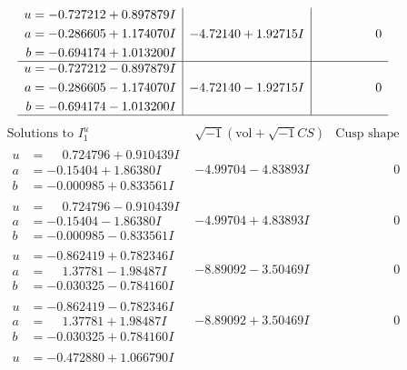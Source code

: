 \documentclass[1p]{elsarticle_modified}
\theoremstyle{definition}
\newcommand{\I}{\sqrt{-1}}
\begin{document}
$$\begin{array}{c|c|c}
\begin{aligned}
u &= -0.727212 + 0.897879 I \\
a &= -0.286605 + 1.174070 I \\
b &= -0.694174 + 1.013200 I\end{aligned}
 & -4.72140 + 1.92715 I & \phantom{-0.000000 } 0 \\ \hline\begin{aligned}
u &= -0.727212 - 0.897879 I \\
a &= -0.286605 - 1.174070 I \\
b &= -0.694174 - 1.013200 I\end{aligned}
 & -4.72140 - 1.92715 I & \phantom{-0.000000 } 0\\
 \hline 
 \end{array}$$\newpage$$\begin{array}{c|c|c}  
\text{Solutions to }I^u_{1}& \I (\text{vol} + \sqrt{-1}CS) & \text{Cusp shape}\\
 \hline 
\begin{aligned}
u &= \phantom{-}0.724796 + 0.910439 I \\
a &= -0.15404 + 1.86380 I \\
b &= -0.000985 + 0.833561 I\end{aligned}
 & -4.99704 - 4.83893 I & \phantom{-0.000000 } 0 \\ \hline\begin{aligned}
u &= \phantom{-}0.724796 - 0.910439 I \\
a &= -0.15404 - 1.86380 I \\
b &= -0.000985 - 0.833561 I\end{aligned}
 & -4.99704 + 4.83893 I & \phantom{-0.000000 } 0 \\ \hline\begin{aligned}
u &= -0.862419 + 0.782346 I \\
a &= \phantom{-}1.37781 - 1.98487 I \\
b &= -0.030325 - 0.784160 I\end{aligned}
 & -8.89092 - 3.50469 I & \phantom{-0.000000 } 0 \\ \hline\begin{aligned}
u &= -0.862419 - 0.782346 I \\
a &= \phantom{-}1.37781 + 1.98487 I \\
b &= -0.030325 + 0.784160 I\end{aligned}
 & -8.89092 + 3.50469 I & \phantom{-0.000000 } 0 \\ \hline\begin{aligned}
u &= -0.472880 + 1.066790 I \\

\end{aligned}
\end{array}$$
\end{document}
